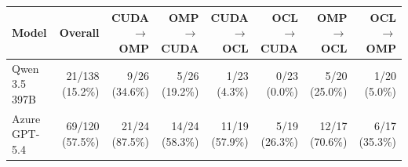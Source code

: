 \begin{tabular}{lrrrrrrr}
\toprule
Model & Overall & CUDA$\to$OMP & OMP$\to$CUDA & CUDA$\to$OCL & OCL$\to$CUDA & OMP$\to$OCL & OCL$\to$OMP \\
\midrule
Qwen 3.5 397B & 21/138 (15.2\%) & 9/26 (34.6\%) & 5/26 (19.2\%) & 1/23 (4.3\%) & 0/23 (0.0\%) & 5/20 (25.0\%) & 1/20 (5.0\%) \\
Azure GPT-5.4 & 69/120 (57.5\%) & 21/24 (87.5\%) & 14/24 (58.3\%) & 11/19 (57.9\%) & 5/19 (26.3\%) & 12/17 (70.6\%) & 6/17 (35.3\%) \\
\bottomrule
\end{tabular}
